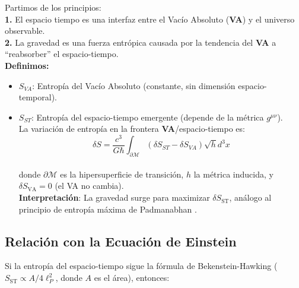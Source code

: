 \documentclass[a4paper]{article}
\theoremstyle{definition}
\theoremstyle{remark}
\numberwithin{equation}{section}
\begin{document}
	\begin{flushleft}
		Partimos de los principios:\\
		
		\textbf{1.} El espacio tiempo es una interfaz entre el Vacío Absoluto (\textbf{VA}) y el universo observable.\\
		
		\textbf{2.} La gravedad es una fuerza entrópica causada por la tendencia del \textbf{VA} a ``reabsorber'' el espacio-tiempo.\\
		
		\textbf{Definimos:}
		
		\begin{itemize}
			\item \( S_{VA} \): Entropía del Vacío Absoluto (constante, sin dimensión espacio-temporal).\\
			
			\item \( S_{ST} \): Entropía del espacio-tiempo emergente (depende de la métrica \(g^{\mu\nu}\)).\\
			
			La variación de entropía en la frontera \textbf{VA}/espacio-tiempo es:\\
			
			\begin{equation}
				\delta S = \frac{c^3}{G \hbar} \int_{\partial \mathcal{M}} \left( \delta S_{ST} - \delta S_{VA} \right) \sqrt{h}d^3 x
			\end{equation}\\
			
			donde \( \partial \mathcal{M} \) es la hipersuperficie de transición, \( h \) la métrica inducida, y \( \delta S_{\text{VA}} = 0 \) (el VA no cambia).\\
			
			\textbf{Interpretación}: La gravedad surge para maximizar \( \delta S_{\text{ST}} \), análogo al principio de entropía máxima de Padmanabhan \cite{Padmanabhan}.
		\end{itemize}
	\end{flushleft}
	
	
	\subsection{Relación con la Ecuación de Einstein}
	
	
	Si la entropía del espacio-tiempo sigue la fórmula de Bekenstein-Hawking (\( S_{\text{ST}} \propto A/4\ell_P^2 \), donde \( A \) es el área), entonces:\\
	
\end{document}
